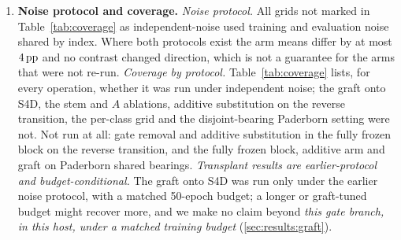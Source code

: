 \begin{enumerate}
\item \textbf{Noise protocol and coverage.} \emph{Noise protocol.} All grids not marked in Table~\ref{tab:coverage} as independent-noise used training and evaluation noise shared by index. Where both protocols exist the arm means differ by at most $4\,\mathrm{pp}$ and no contrast changed direction, which is not a guarantee for the arms that were not re-run. \emph{Coverage by protocol.} Table~\ref{tab:coverage} lists, for every operation, whether it was run under independent noise; the graft onto S4D, the stem and $A$ ablations, additive substitution on the reverse transition, the per-class grid and the disjoint-bearing Paderborn setting were not. Not run at all: gate removal and additive substitution in the fully frozen block on the reverse transition, and the fully frozen block, additive arm and graft on Paderborn shared bearings. \emph{Transplant results are earlier-protocol and budget-conditional.} The graft onto S4D was run only under the earlier noise protocol, with a matched 50-epoch budget; a longer or graft-tuned budget might recover more, and we make no claim beyond \emph{this gate branch, in this host, under a matched training budget} (\ref{sec:results:graft}).

\end{enumerate}
